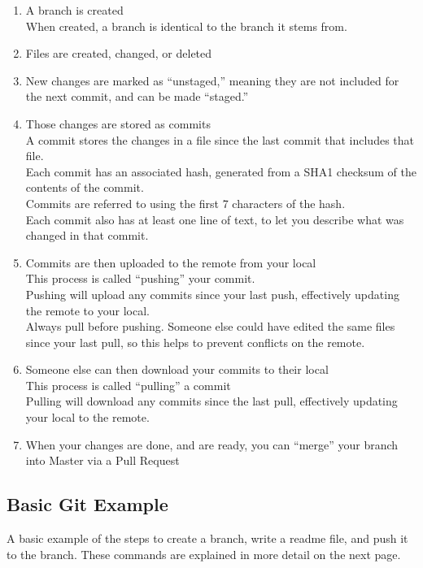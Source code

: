 \documentclass{article}
\begin{document}
\begin{enumerate}
	\item A branch is created
		\\When created, a branch is identical to the branch it stems from.
	\item Files are created, changed, or deleted
	\item New changes are marked as ``unstaged,'' meaning they are not included for the next commit, and can be made ``staged.''
	\item Those changes are stored as commits
		\\A commit stores the changes in a file since the last commit that includes that file.
		\\Each commit has an associated hash, generated from a SHA1 checksum of the contents of the commit.
		\\Commits are referred to using the first 7 characters of the hash.
		\\Each commit also has at least one line of text, to let you describe what was changed in that commit.
	\item Commits are then uploaded to the remote from your local
		\\This process is called ``pushing'' your commit.
		\\Pushing will upload any commits since your last push, effectively updating the remote to your local.
		\\Always pull before pushing. Someone else could have edited the same files since your last pull, so this helps to prevent conflicts on the remote.
	\item Someone else can then download your commits to their local
		\\This process is called ``pulling'' a commit
		\\Pulling will download any commits since the last pull, effectively updating your local to the remote.
	\item When your changes are done, and are ready, you can ``merge'' your branch into Master via a Pull Request
\end{enumerate}

\subsection{Basic Git Example}

A basic example of the steps to create a branch, write a readme file, and push it to the branch.
These commands are explained in more detail on the next page.
\end{document}
